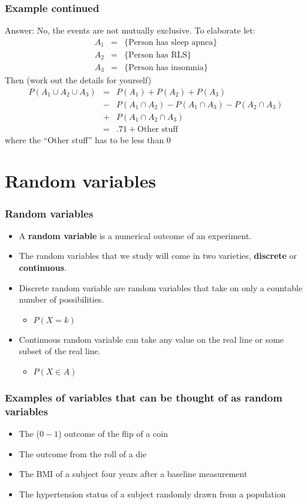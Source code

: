 \documentclass[aspectratio=169]{beamer}
\begin{document}
\begin{frame} \frametitle{Example continued}
  Answer: No, the events are not mutually exclusive. To elaborate let:
  \begin{eqnarray*}
    A_1 & = & \{\mbox{Person has sleep apnea}\} \\
    A_2 & = & \{\mbox{Person has RLS}\} \\
    A_3 & = & \{\mbox{Person has insomnia}\}
  \end{eqnarray*}
  Then (work out the details for yourself)
  \begin{eqnarray*}
    P(A_1 \cup A_2 \cup A_3) & = & P(A_1) + P(A_2) + P(A_3) \\
   & - & P(A_1 \cap A_2) - P(A_1 \cap A_3) - P(A_2 \cap A_3) \\
   & + & P(A_1 \cap A_2 \cap A_3) \\
   & = & .71 + \mbox{Other stuff}
  \end{eqnarray*}
where the ``Other stuff'' has to be less than $0$
\end{frame}


\section{Random variables}
\begin{frame}
\frametitle{Random variables}
\begin{itemize}
\item A {\bf random variable} is a numerical outcome of an experiment.
\item The random variables that we study will come in two varieties,
  {\bf discrete} or {\bf continuous}.
\item Discrete random variable are random variables that take on only a
countable number of possibilities.
\begin{itemize}{}
\item $P(X = k)$
\end{itemize}
\item Continuous random variable can take any value on the real line or some
subset of the real line.
\begin{itemize}{}
\item $P(X \in A)$
\end{itemize}
\end{itemize}
\end{frame}

\begin{frame}
\frametitle{Examples of variables that can be thought of as random variables}
\begin{itemize}
\item The ($0-1$) outcome of the flip of a coin
\item The outcome from the roll of a die
\item The BMI of a subject four years after a baseline measurement
\item The hypertension status of a subject randomly drawn from a population
\end{itemize}
\end{frame}
\end{document}
